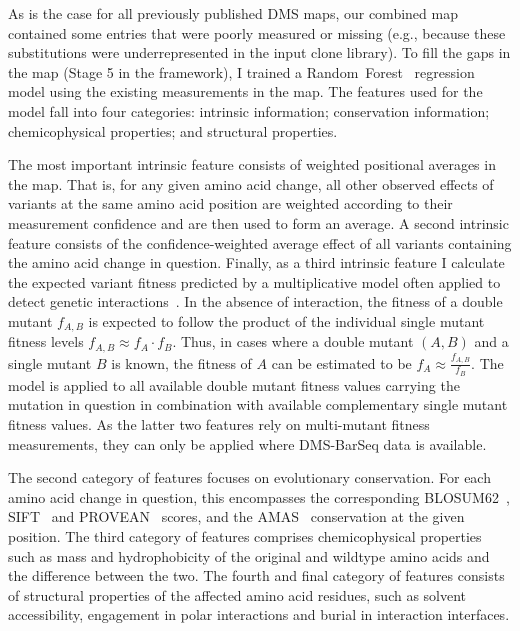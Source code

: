 As is the case for all previously published DMS maps, our combined map contained some entries that were poorly measured or missing (e.g., because these substitutions were underrepresented in the input clone library). To fill the gaps in the map (Stage 5 in the framework), I trained a Random~Forest~\cite{breiman_random_2001} regression model using the existing measurements in the map. The features used for the model fall into four categories: intrinsic information; conservation information; chemicophysical properties; and structural properties. 

The most important intrinsic feature consists of weighted positional averages in the map. That is, for any given amino acid change, all other observed effects of variants at the same amino acid position are weighted according to their measurement confidence and are then used to form an average. A second intrinsic feature consists of the confidence-weighted average effect of all variants containing the amino acid change in question. Finally, as a third intrinsic feature I calculate the expected variant fitness predicted by a multiplicative model often applied to detect genetic interactions~\cite{phillips_language_1998,onge_systematic_2007}. In the absence of interaction, the fitness of a double mutant $f_{A,B}$ is expected to follow the product of the individual single mutant fitness levels $f_{A,B}\approx f_A \cdot f_B$. Thus, in cases where a double mutant $(A,B)$ and a single mutant $B$ is known, the fitness of $A$ can be estimated to be $f_A\approx \frac{f_{A,B}}{f_B}$. The model is applied to all available double mutant fitness values carrying the mutation in question in combination with available complementary single mutant fitness values. As the latter two features rely on multi-mutant fitness measurements, they can only be applied where DMS-BarSeq data is available. 

The second category of features focuses on evolutionary conservation. For each amino acid change in question, this encompasses the corresponding BLOSUM62~\cite{henikoff_amino_1992}, SIFT~\cite{ng_predicting_2001} and PROVEAN~\cite{choi_predicting_2012} scores, and the AMAS~\cite{livingstone_protein_1993} conservation at the given position. The third category of features comprises chemicophysical properties such as mass and hydrophobicity of the original and wildtype amino acids and the difference between the two. The fourth and final category of features consists of structural properties of the affected amino acid residues, such as solvent accessibility, engagement in polar interactions and burial in interaction interfaces.

